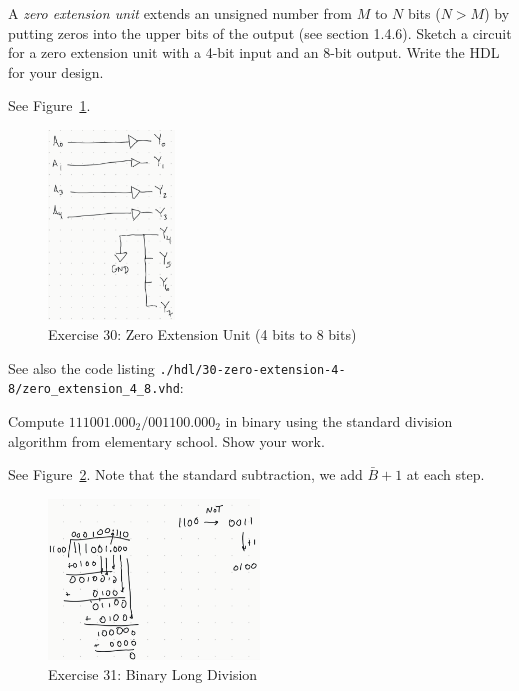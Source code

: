 \documentclass[12pt]{article}
\newenvironment{ex}[2][Exercise]{\begin{trivlist}
		\item[\hskip \labelsep {\bfseries #1}\hskip \labelsep {\bfseries #2.}]}{\end{trivlist}}
\newenvironment{sol}[1][Solution]{\begin{trivlist}
		\item[\hskip \labelsep {\bfseries #1:}]}{\end{trivlist}}
\begin{document}
\begin{ex}{5.30}
	A \emph{zero extension unit} extends an unsigned number from $M$ to $N$
	bits ($N>M$) by putting zeros  into the upper bits of the output 
	(see section 1.4.6). Sketch a circuit for a zero extension unit with a 4-bit
	input and an 8-bit output. Write the HDL for your design.
\end{ex}

\begin{sol}
	See Figure~\ref{exercise-05-30-zero-extension-unit}.
	\begin{figure}
		\centering
		\includegraphics[width=0.3\textwidth]{exercise-05-30-zero-extension-unit}
		\caption{Exercise 30: Zero Extension Unit (4 bits to 8 bits)}
		\label{exercise-05-30-zero-extension-unit}
	\end{figure}
	See also the code listing \texttt{./hdl/30-zero-extension-4-8/zero\_extension\_4\_8.vhd}:
	
\end{sol}

\begin{ex}{5.31}
	Compute $111001.000_2/001100.000_2$ in binary using the standard division
	algorithm from elementary school. Show your work.
\end{ex}

\begin{sol}
	See Figure~\ref{exercise-31-binary-long-division}. Note that the standard
	subtraction, we add $\bar{B}+1$ at each step.
	\begin{figure}
		\centering
		\includegraphics[width=0.5\textwidth]{exercise-31-binary-long-division}
		\caption{Exercise 31: Binary Long Division}
		\label{exercise-31-binary-long-division}
	\end{figure}
\end{sol}
\end{document}
